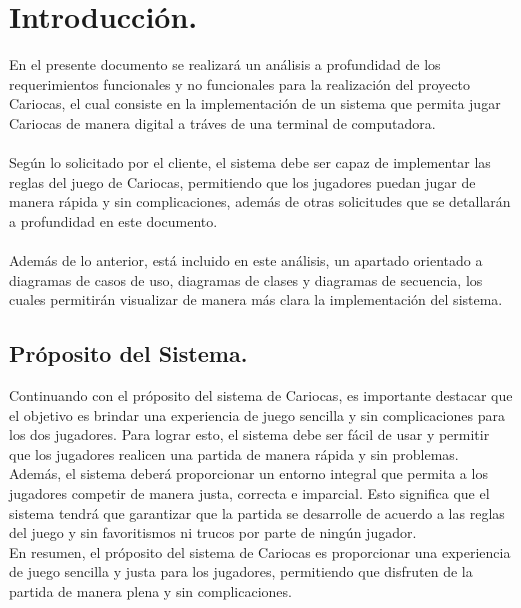\section{Introducción.}\label{cap:intro}
En el presente documento se realizará un análisis a profundidad de los requerimientos funcionales y no funcionales para la realización del proyecto
Cariocas, el cual consiste en la implementación de un sistema que permita jugar Cariocas de manera digital a tráves de una terminal de computadora.\\
\\Según lo solicitado por el cliente, el sistema debe ser capaz de implementar las reglas del juego de Cariocas,
permitiendo que los jugadores puedan jugar de manera rápida y sin complicaciones, además de otras solicitudes 
que se detallarán a profundidad en este documento.\\
\\Además de lo anterior, está incluido en este análisis, un apartado orientado a diagramas de casos de uso,
diagramas de clases y diagramas de secuencia, los cuales permitirán visualizar de manera más clara la implementación del sistema.\\



\subsection{Próposito del Sistema.}\label{cap:proposito}
Continuando con el próposito del sistema de Cariocas, es importante destacar que el objetivo es 
brindar una experiencia de juego sencilla y sin complicaciones para los dos jugadores. Para lograr esto, 
el sistema debe ser fácil de usar y permitir que los jugadores realicen una partida de manera rápida y sin problemas.\\

Además, el sistema deberá proporcionar un entorno integral que permita a los jugadores competir de manera justa, 
correcta e imparcial. Esto significa que el sistema tendrá que garantizar que la partida se desarrolle de acuerdo a las reglas del juego y sin 
favoritismos ni trucos por parte de ningún jugador.\\

En resumen, el próposito del sistema de Cariocas es proporcionar una experiencia de juego sencilla y justa para los 
jugadores, permitiendo que disfruten de la partida de manera plena y sin complicaciones.



